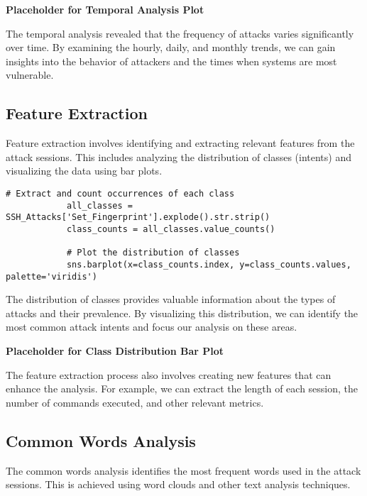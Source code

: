         \textbf{Placeholder for Temporal Analysis Plot}

        The temporal analysis revealed that the frequency of attacks varies significantly over time. By examining the hourly, daily, and monthly trends, we can gain insights into the behavior of attackers and the times when systems are most vulnerable.

    \subsection{Feature Extraction}
    
        Feature extraction involves identifying and extracting relevant features from the attack sessions. This includes analyzing the distribution of classes (intents) and visualizing the data using bar plots.

        \begin{lstlisting}[caption={Extract and visualize class distribution}, label={lst:extract-visualize-classes}]
            # Extract and count occurrences of each class
            all_classes = SSH_Attacks['Set_Fingerprint'].explode().str.strip()
            class_counts = all_classes.value_counts()

            # Plot the distribution of classes
            sns.barplot(x=class_counts.index, y=class_counts.values, palette='viridis')
        \end{lstlisting}
        
        \vspace{1em}

        The distribution of classes provides valuable information about the types of attacks and their prevalence. By visualizing this distribution, we can identify the most common attack intents and focus our analysis on these areas.

        \textbf{Placeholder for Class Distribution Bar Plot}

        The feature extraction process also involves creating new features that can enhance the analysis. For example, we can extract the length of each session, the number of commands executed, and other relevant metrics.

    \subsection{Common Words Analysis}
    
        The common words analysis identifies the most frequent words used in the attack sessions. This is achieved using word clouds and other text analysis techniques.

